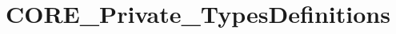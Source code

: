 \hypertarget{group___c_o_r_e___private___types_definitions}{}\section{C\+O\+R\+E\+\_\+\+Private\+\_\+\+Types\+Definitions}
\label{group___c_o_r_e___private___types_definitions}
